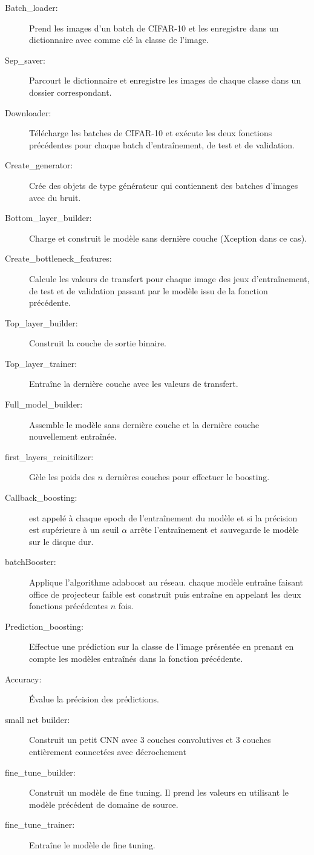 \documentclass[11 pt]{article}
\begin{document}
\begin{appendices}
  \begin{description}
    \item[Batch\_loader:] Prend les images d'un batch de CIFAR-10 et les enregistre dans un dictionnaire avec comme clé la classe de l'image.
    \item[Sep\_saver:] Parcourt le dictionnaire et enregistre les images de chaque classe dans un dossier correspondant.
    \item[Downloader:] Télécharge les batches de CIFAR-10 et exécute les deux fonctions précédentes pour chaque batch d’entraînement, de test et de validation.
    \item[Create\_generator:] Crée des objets de type générateur qui contiennent des batches d'images avec du bruit.
    \item[Bottom\_layer\_builder:] Charge et construit le modèle sans dernière couche (Xception dans ce cas).
    \item[Create\_bottleneck\_features:] Calcule les valeurs de transfert pour chaque image des jeux d’entraînement, de test et de validation passant par le modèle issu de la fonction précédente.
    \item[Top\_layer\_builder:] Construit la couche de sortie binaire.
    \item[Top\_layer\_trainer:] Entraîne la dernière couche avec les valeurs de transfert.
    \item[Full\_model\_builder:] Assemble le modèle sans dernière couche et la dernière couche nouvellement entraînée.
    \item[first\_layers\_reinitilizer:] Gèle les poids des $n$ dernières couches pour effectuer le boosting.
    \item[Callback\_boosting:] est appelé à chaque epoch de l’entraînement du modèle et si la précision est supérieure à un seuil $\alpha$ arrête l'entraînement et sauvegarde le modèle sur le disque dur.
    \item[batchBooster:] Applique l'algorithme adaboost au réseau. chaque modèle entraîne faisant office de projecteur faible est construit puis entraîne en appelant les deux fonctions précédentes $n$ fois.
    \item[Prediction\_boosting:] Effectue une prédiction sur la classe de l'image présentée en prenant en compte les modèles entraînés dans la fonction précédente.
    \item[Accuracy:] Évalue la précision des prédictions.
    \item[small net builder:] Construit un petit CNN avec 3 couches convolutives et 3 couches entièrement connectées avec décrochement
    \item[fine\_tune\_builder:] Construit un modèle de fine tuning. Il prend les valeurs en utilisant le modèle précédent de domaine de source.
    \item[fine\_tune\_trainer:] Entraîne le modèle de fine tuning.
  \end{description}
\end{appendices}
\end{document}
